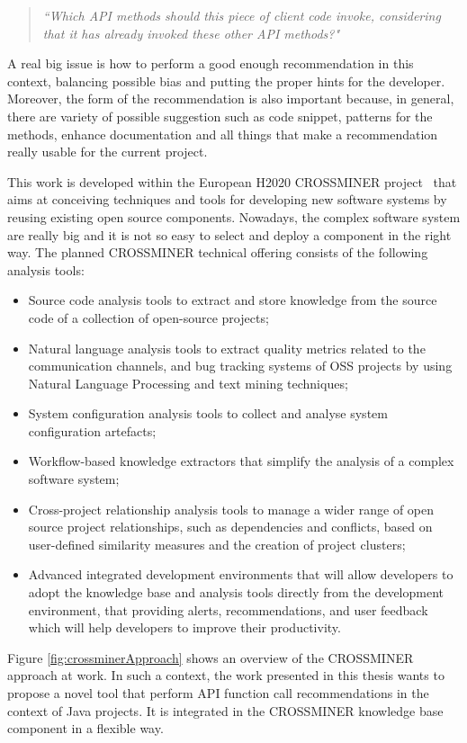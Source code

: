 \begin{quote}
	\textit{``Which API methods should this piece of client code invoke, 
	considering that it has already invoked these other API methods?"}
\end{quote}


A real big issue is how to perform a good enough recommendation in this 
context, balancing possible bias and putting the proper hints for the 
developer. Moreover, the form of the recommendation is also important because, 
in general, there are variety of possible suggestion such as code snippet, 
patterns for the methods, enhance documentation and all things that make a 
recommendation really usable for the current project. 

This work is developed within the European H2020 CROSSMINER 
project~\cite{CROSSMINER} that aims at conceiving techniques 
and tools for developing new software systems by reusing existing open source 
components. Nowadays, the complex software system are really big and it is not 
so easy to select and deploy a component in the right way. The planned 
CROSSMINER technical offering consists of the following analysis tools:
\begin{itemize}
	\item Source code analysis tools to extract and store knowledge from the 
	source code of a collection of open-source projects;
	\item Natural language analysis tools to extract quality metrics related to 
	the communication channels, and bug tracking systems of OSS projects by 
	using Natural Language Processing and text mining techniques;
	\item System configuration analysis tools to collect and analyse system 
	configuration artefacts;
	\item Workflow-based knowledge extractors that simplify the analysis of a 
	complex software system;
	\item Cross-project relationship analysis tools to manage a wider range of 
	open source project relationships, such as dependencies and conflicts, 
	based on user-defined similarity measures and the creation of project 
	clusters;
	\item Advanced integrated development environments that will allow 
	developers to adopt the  knowledge base and analysis tools directly from 
	the development environment, that providing alerts, recommendations, and 
	user feedback which will help developers to improve their productivity.
\end{itemize}
Figure \ref{fig:crossminerApproach} shows an overview of the CROSSMINER 
approach at work. In such a context, the work presented in this thesis wants to 
propose a novel tool that perform API function call recommendations in the 
context of Java projects. It is integrated in the CROSSMINER knowledge base 
component in a  flexible way. 



